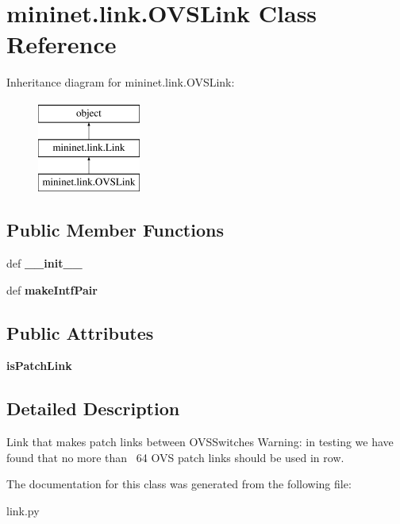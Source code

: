 \hypertarget{classmininet_1_1link_1_1OVSLink}{\section{mininet.\-link.\-O\-V\-S\-Link Class Reference}
\label{classmininet_1_1link_1_1OVSLink}
}
Inheritance diagram for mininet.\-link.\-O\-V\-S\-Link\-:\begin{figure}[H]
\begin{center}
\leavevmode
\includegraphics[height=3.000000cm]{classmininet_1_1link_1_1OVSLink}
\end{center}
\end{figure}
\subsection*{Public Member Functions}
\begin{DoxyCompactItemize}
\item 
\hypertarget{classmininet_1_1link_1_1OVSLink_a87c11ce7569403fe4829870adf8256d7}{def {\bfseries \-\_\-\-\_\-init\-\_\-\-\_\-}}\label{classmininet_1_1link_1_1OVSLink_a87c11ce7569403fe4829870adf8256d7}

\item 
\hypertarget{classmininet_1_1link_1_1OVSLink_ad9cd6272bde17df17140a0b37b884e50}{def {\bfseries make\-Intf\-Pair}}\label{classmininet_1_1link_1_1OVSLink_ad9cd6272bde17df17140a0b37b884e50}

\end{DoxyCompactItemize}
\subsection*{Public Attributes}
\begin{DoxyCompactItemize}
\item 
\hypertarget{classmininet_1_1link_1_1OVSLink_a25082afab9dd72f193cd35fff083c7bd}{{\bfseries is\-Patch\-Link}}\label{classmininet_1_1link_1_1OVSLink_a25082afab9dd72f193cd35fff083c7bd}

\end{DoxyCompactItemize}


\subsection{Detailed Description}
\begin{DoxyVerb}Link that makes patch links between OVSSwitches
   Warning: in testing we have found that no more
   than ~64 OVS patch links should be used in row.\end{DoxyVerb}
 

The documentation for this class was generated from the following file\-:\begin{DoxyCompactItemize}
\item 
link.\-py\end{DoxyCompactItemize}
